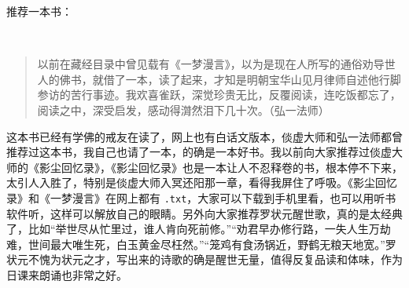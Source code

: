 推荐一本书：

\begin{book}[《一梦漫言》]~\\
    \begin{quote}
        以前在藏经目录中曾见载有《一梦漫言》，以为是现在人所写的通俗劝导世人的佛书，就借了一本，读了起来，才知是明朝宝华山见月律师自述他行脚参访的苦行事迹。我欢喜雀跃，深觉珍贵无比，反覆阅读，连吃饭都忘了，阅读之中，深受启发，感动得潸然泪下几十次。（弘一法师）
    \end{quote}

    这本书已经有学佛的戒友在读了，网上也有白话文版本，倓虚大师和弘一法师都曾推荐过这本书，我自己也请了一本，的确是一本好书。我以前向大家推荐过倓虚大师的《影尘回忆录》，《影尘回忆录》也是一本让人不忍释卷的书，根本停不下来，太引人入胜了，特别是倓虚大师入冥还阳那一章，看得我屏住了呼吸。《影尘回忆录》和《一梦漫言》在网上都有 \texttt{.txt}，大家可以下载到手机里看，也可以用听书软件听，这样可以解放自己的眼睛。另外向大家推荐罗状元醒世歌，真的是太经典了，比如“举世尽从忙里过，谁人肯向死前修。”“劝君早办修行路，一失人生万劫难，世间最大唯生死，白玉黄金尽枉然。”“笼鸡有食汤锅近，野鹤无粮天地宽。”罗状元不愧为状元之才，写出来的诗歌的确是醒世无量，值得反复品读和体味，作为日课来朗诵也非常之好。
\end{book}
